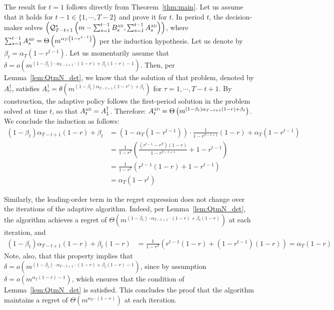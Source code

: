 \documentclass[nonblindrev]{informs3noheader}
\def\calQ{\mathcal{Q}}
\begin{document}
The result for $t=1$ follows directly from Theorem~\ref{thm:main}. Let us assume that it holds for $t-1\in\{1,\cdots,T-2\}$ and prove it for $t$. In period $t$, the decision-maker solves $\left(\calQ^*_{T-t+1}\left(m-\sum_{s=1}^{t-1}B^{\textsc{ad}}_s,\sum_{s=1}^{t-1} A^{\textsc{ad}}_s\right)\right)$, where $\sum_{s=1}^{t-1} A^{\textsc{ad}}_s=\Theta\left(m^{\alpha_T\left(1-r^{t-1}\right)}\right)$ per the induction hypothesis. Let us denote by $\beta_t=\alpha_T\left(1-r^{t-1}\right)$. Let us momentarily assume that  $\delta=o\left(m^{(1-\beta_t)\cdot\alpha_{T-t+1}\cdot(1-r)+\beta_t(1-r)-1}\right)$. Then, per Lemma~\ref{lem:QtmN_det}, we know that the solution of that problem, denoted by $A^\dagger_\tau$, satisfies 
$A^\dagger_\tau=\theta\left(m^{(1-\beta_t)\alpha_{T-t+1}\left(1-r^\tau\right)+\beta_t}\right)$ for $\tau=1,\cdots,T-t+1$. By construction, the adaptive policy follows the first-period solution in the problem solved at time $t$, so that $A^{\textsc{ad}}_t=A^\dagger_1$. Therefore: $A^{\textsc{ad}}_t=\Theta\left(m^{(1-\beta_t)\alpha_{T-t+1}(1-r)+\beta_t}\right)$. We conclude the induction as follows:
\begin{align*}
    (1-\beta_t)\alpha_{T-t+1}(1-r)+\beta_t
    &=\left(1-\alpha_T(1-r^{t-1})\right)\cdot\frac{1}{1-r^{T-t+1}}(1-r)+\alpha_T(1-r^{t-1})\\
    &=\frac{1}{1-r^T}\left(\frac{(r^{t-1}-r^T)(1-r)}{1-r^{T-t+1}}+1-r^{t-1}\right)\\
    &=\frac{1}{1-r^T}\left(r^{t-1}(1-r)+1-r^{t-1}\right)\\
    &=\alpha_T(1-r^t)
\end{align*}

Similarly, the leading-order term in the regret expression does not change over the iterations of the adaptive algorithm. Indeed, per Lemma~\ref{lem:QtmN_det}, the algorithm achieves a regret of $\Theta\left(m^{(1-\beta_t)\cdot\alpha_{T-t+1}\cdot(1-r)+\beta_t(1-r)}\right)$ at each iteration, and
\begin{align*}
    (1-\beta_t)\alpha_{T-t+1}(1-r)+\beta_t(1-r)
    &=\frac{1}{1-r^T}\left(r^{t-1}(1-r)+(1-r^{t-1})(1-r)\right)
    =\alpha_T(1-r)
\end{align*}
Note, also, that this property implies that $\delta=o\left(m^{(1-\beta_t)\cdot\alpha_{T-t+1}\cdot(1-r)+\beta_t(1-r)-1}\right)$, since by assumption $\delta=o\left(m^{\alpha_T(1-r)-1}\right)$, which ensures that the condition of Lemma~\ref{lem:QtmN_det} is satisfied. This concludes the proof that the algorithm maintains a regret of $\Theta\left(m^{\alpha_T\cdot(1-r)}\right)$ at each iteration.
\end{document}
